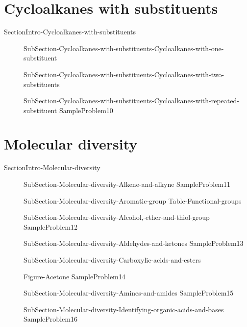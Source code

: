 \documentclass[main.tex]{subfiles}
\newcommand\chapterlabel{Ch-orgo}\setcounter{figurenewcounter}{0}\setcounter{tablenewcounter}{0}\setcounter{formulanewcounter}{0}
\begin{document}
\section{Cycloalkanes with substituents}{SectionIntro-Cycloalkanes-with-substituents}
\sloppy
\begin{description}
\item[]{SubSection-Cycloalkanes-with-substituents-Cycloalkanes-with-one-substituent}
\item[] {SubSection-Cycloalkanes-with-substituents-Cycloalkanes-with-two-substituents}
\item[]{SubSection-Cycloalkanes-with-substituents-Cycloalkanes-with-repeated-substituent}
{SampleProblem10}

\end{description}




\section{Molecular diversity}{SectionIntro-Molecular-diversity}
\sloppy\begin{description}
\item[]{SubSection-Molecular-diversity-Alkene-and-alkyne}
{SampleProblem11}
 \item[]{SubSection-Molecular-diversity-Aromatic-group}
 {Table-Functional-groups}
\item[]{SubSection-Molecular-diversity-Alcohol,-ether-and-thiol-group}
{SampleProblem12}
\item[] {SubSection-Molecular-diversity-Aldehydes-and-ketones}
{SampleProblem13}
\item[]{SubSection-Molecular-diversity-Carboxylic-acids-and-esters}

    {Figure-Acetone}
{SampleProblem14}

 \item[] {SubSection-Molecular-diversity-Amines-and-amides}
{SampleProblem15}
\item[]{SubSection-Molecular-diversity-Identifying-organic-acids-and-bases}
{SampleProblem16}
 \end{description}
 
\end{document}
